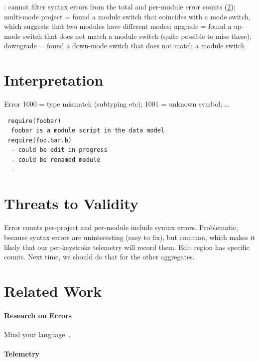 \documentclass[
  acmsmall,
  review,
]{acmart}
\begin{document}
:
cannot filter syntax errors from the total and per-module error counts (\cref{s:threats});
multi-mode project = found a module switch that coincides with a mode switch, which suggests that two modules have different modes;
upgrade = found a up-mode switch that does not match a module switch (quite possible to miss these);
downgrade = found a down-mode switch that does not match a module switch


\section{Interpretation}

Error 1000 = type mismatch (subtyping etc);
1001 = unknown symbol;
\ldots



\begin{verbatim}
 require(foobar)
  foobar is a module script in the data model
 require(foo.bar.b)
  - could be edit in progress
  - could be renamed module
  - 
\end{verbatim}


\section{Threats to Validity}
\label{s:threats}

Error counts per-project and per-module include syntax errors.
Problematic, because syntax errors are uninteresting (easy to fix),
but common, which makes it likely that our per-keystroke telemetry will record them.
Edit region has specific counts.
Next time, we should do that for the other aggregates.


\section{Related Work}
\label{s:related}

\paragraph{Research on Errors}

Mind your language~\cite{mfk-onward-2011}.


\paragraph{Telemetry}
\end{document}
